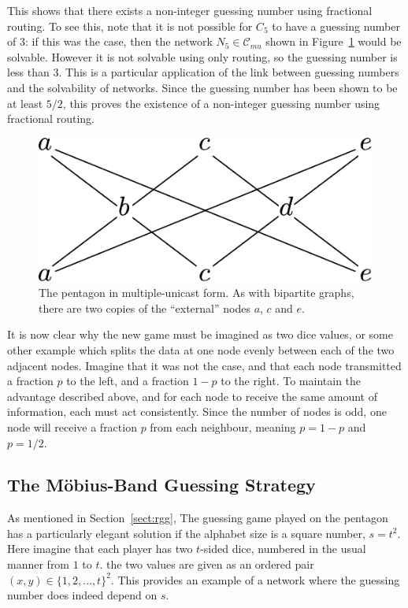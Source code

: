 This shows that there exists a non-integer guessing number using fractional routing. To see this, note that it is not possible for $C_5$ to have a guessing number of $3$: if this was the case, then the network $N_5 \in \mathcal{C}_{mu}$ shown in Figure~\ref{pentagon-mu} would be solvable. However it is not solvable using only routing, so the guessing number is less than $3$. This is a particular application of the link between guessing numbers and the solvability of networks. Since the guessing number has been shown to be at least $5/2$, this proves the existence of a non-integer guessing number using fractional routing.

\begin{figure}[ht]
	\centering
	\includegraphics[width=.5\textwidth]{figures/pentagon_mu.pdf}
	\caption[Pentagon problem in multiple-unicast form]{The pentagon in multiple-unicast form. As with bipartite graphs, there are two copies of the ``external'' nodes $a$, $c$ and $e$.}
	\label{pentagon-mu}
\end{figure}

It is now clear why the new game must be imagined as two dice values, or some other example which splits the data at one node evenly between each of the two adjacent nodes. Imagine that it was not the case, and that each node transmitted a fraction $p$ to the left, and a fraction $1 - p$ to the right. To maintain the advantage described above, and for each node to receive the same amount of information, each must act consistently. Since the number of nodes is odd, one node will receive a fraction $p$ from each neighbour, meaning $p = 1 - p$ and $p = 1/2$.

\subsection{The M{\"o}bius-Band Guessing Strategy}
\label{sect:pentagon-proof}

As mentioned in Section~\ref{sect:rgg}, The guessing game played on the pentagon has a particularly elegant solution if the alphabet size is a square number, $s = t^2$. Here imagine that each player has two $t$-sided dice, numbered in the usual manner from $1$ to $t$. the two values are given as an ordered pair $(x, y) \in \{1, 2, \dots, t\}^2$. This provides an example of a network where the guessing number does indeed depend on $s$.

